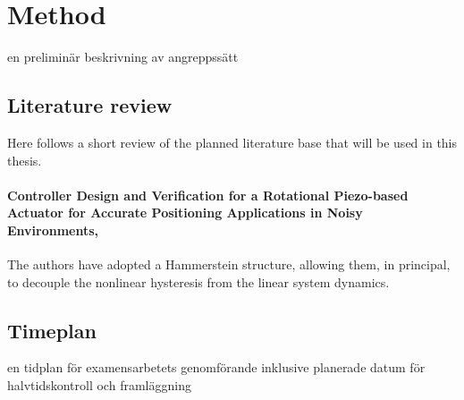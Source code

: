 \chapter{Method}\label{cha:metod}
en preliminär beskrivning av angreppssätt

\section{Literature review}
Here follows a short review of the planned literature base that will be used in this thesis.

\subsubsection*{Controller Design and Verification for a Rotational Piezo-based Actuator for Accurate Positioning Applications in Noisy Environments, \citet*{ButcherController:2015}}
The authors have adopted a Hammerstein structure, allowing them, in principal, to decouple the nonlinear hysteresis from the linear system dynamics.





\citep{ButcherIdentification:2015}

\citep{Biggio:2014}

\citep{FlemingLeang:2014}


\section{Timeplan}
en tidplan för examensarbetets genomförande inklusive planerade datum för halvtidskontroll och framläggning
